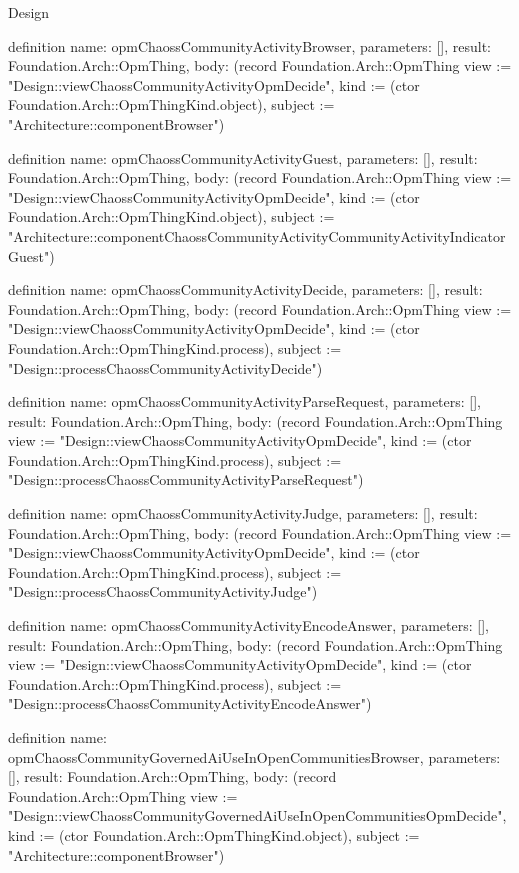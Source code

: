 \begin{lexlean}{Design}
\begin{semanticmodule}
definition{
  name: opmChaossCommunityActivityBrowser,
  parameters: [],
  result: Foundation.Arch::OpmThing,
  body: (record Foundation.Arch::OpmThing {view := "Design::viewChaossCommunityActivityOpmDecide", kind := (ctor Foundation.Arch::OpmThingKind.object), subject := "Architecture::componentBrowser"})
}

definition{
  name: opmChaossCommunityActivityGuest,
  parameters: [],
  result: Foundation.Arch::OpmThing,
  body: (record Foundation.Arch::OpmThing {view := "Design::viewChaossCommunityActivityOpmDecide", kind := (ctor Foundation.Arch::OpmThingKind.object), subject := "Architecture::componentChaossCommunityActivityCommunityActivityIndicatorGuest"})
}

definition{
  name: opmChaossCommunityActivityDecide,
  parameters: [],
  result: Foundation.Arch::OpmThing,
  body: (record Foundation.Arch::OpmThing {view := "Design::viewChaossCommunityActivityOpmDecide", kind := (ctor Foundation.Arch::OpmThingKind.process), subject := "Design::processChaossCommunityActivityDecide"})
}

definition{
  name: opmChaossCommunityActivityParseRequest,
  parameters: [],
  result: Foundation.Arch::OpmThing,
  body: (record Foundation.Arch::OpmThing {view := "Design::viewChaossCommunityActivityOpmDecide", kind := (ctor Foundation.Arch::OpmThingKind.process), subject := "Design::processChaossCommunityActivityParseRequest"})
}

definition{
  name: opmChaossCommunityActivityJudge,
  parameters: [],
  result: Foundation.Arch::OpmThing,
  body: (record Foundation.Arch::OpmThing {view := "Design::viewChaossCommunityActivityOpmDecide", kind := (ctor Foundation.Arch::OpmThingKind.process), subject := "Design::processChaossCommunityActivityJudge"})
}

definition{
  name: opmChaossCommunityActivityEncodeAnswer,
  parameters: [],
  result: Foundation.Arch::OpmThing,
  body: (record Foundation.Arch::OpmThing {view := "Design::viewChaossCommunityActivityOpmDecide", kind := (ctor Foundation.Arch::OpmThingKind.process), subject := "Design::processChaossCommunityActivityEncodeAnswer"})
}

definition{
  name: opmChaossCommunityGovernedAiUseInOpenCommunitiesBrowser,
  parameters: [],
  result: Foundation.Arch::OpmThing,
  body: (record Foundation.Arch::OpmThing {view := "Design::viewChaossCommunityGovernedAiUseInOpenCommunitiesOpmDecide", kind := (ctor Foundation.Arch::OpmThingKind.object), subject := "Architecture::componentBrowser"})
}


\end{semanticmodule}
\end{lexlean}
